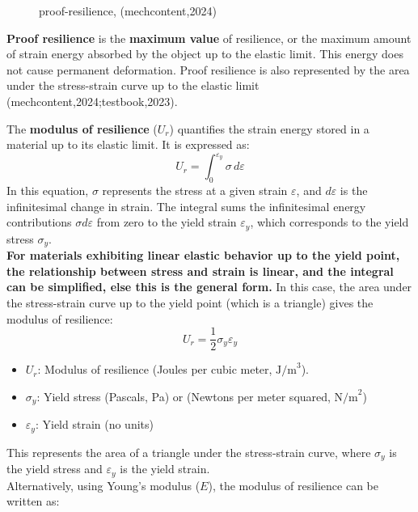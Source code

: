 \documentclass{article}
\begin{document}
{\begin{center}
\begin{minipage}[t]{0.46\textwidth}
\begin{figure}[H]
    \caption{proof-resilience, (mechcontent,2024)}
    \label{fig:proof-resilience}
\end{figure}
\textbf{Proof resilience} is the \textbf{maximum value} of resilience, or the maximum amount of strain energy absorbed by the object up to the elastic limit. This energy does not cause permanent deformation. Proof resilience is also represented by the area under the stress-strain curve up to the elastic limit (mechcontent,2024;testbook,2023).
\end{minipage}

\end{center}

The \textbf{modulus of resilience} ($U_r$) quantifies the strain energy stored in a material up to its elastic limit. It is expressed as:
\begin{equation}
    U_r = \int_0^{\varepsilon_y} \sigma \, d\varepsilon
\end{equation}
In this equation, $\sigma$ represents the stress at a given strain $\varepsilon$, and $d\varepsilon$ is the infinitesimal change in strain. The integral sums the infinitesimal energy contributions $\sigma d\varepsilon$ from zero to the yield strain $\varepsilon_y$, which corresponds to the yield stress $\sigma_y$.\\[8pt]
\textbf{For materials exhibiting linear elastic behavior up to the yield point, the relationship between stress and strain is linear, and the integral can be simplified, else this is the general form.} 
\newpage
In this case, the area under the stress-strain curve up to the yield point (which is a triangle) gives the modulus of resilience:
\begin{equation}
    U_r = \frac{1}{2} \sigma_y \varepsilon_y
\end{equation}
\begin{itemize}[itemsep=-1mm]
    \item \(U_r\): Modulus of resilience (Joules per cubic meter, \( \text{J/m}^3 \)).
    \item \( \sigma_y \): {Yield stress} (Pascals, Pa) or (Newtons per meter squared, \( \text{N/m}^2 \))
    \item \( \varepsilon_y \): {Yield strain} (no units)
\end{itemize}
This represents the area of a triangle under the stress-strain curve, where \( \sigma_y \) is the yield stress and \( \varepsilon_y \) is the yield strain.\\[8pt]
Alternatively, using Young's modulus (\( E \)), the modulus of resilience can be written as:
}
\end{document}
